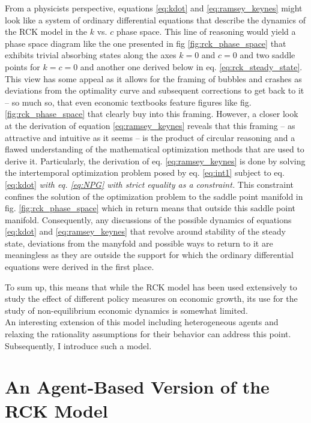 From a physicists perspective, equations \eqref{eq:kdot} and \eqref{eq:ramsey_keynes} might look like a system of ordinary differential equations that describe the dynamics of the RCK model in the $k$ vs. $c$ phase space. This line of reasoning would yield a phase space diagram like the one presented in fig \ref{fig:rck_phase_space} that exhibits trivial absorbing states along the axes $k=0$ and $c=0$ and two saddle points for $k=c=0$ and another one derived below in eq. \eqref{eq:rck_steady_state}.
This view has some appeal as it allows for the framing of bubbles and crashes as deviations from the optimality curve and subsequent corrections to get back to it -- so much so, that even economic textbooks feature figures like fig. \ref{fig:rck_phase_space} that clearly buy into this framing.
However, a closer look at the derivation of equation \eqref{eq:ramsey_keynes} reveals that this framing -- as attractive and intuitive as it seems -- is the product of circular reasoning and a flawed understanding of the mathematical optimization methods that are used to derive it. Particularly, the derivation of eq. \eqref{eq:ramsey_keynes} is done by solving the intertemporal optimization problem posed by eq. \eqref{eq:int1} subject to eq. \eqref{eq:kdot} \emph{with eq. \eqref{eq:NPG} with strict equality as a constraint.} This constraint confines the solution of the optimization problem to the saddle point manifold in fig. \ref{fig:rck_phase_space} which in return means that outside this saddle point manifold. Consequently, any discussions of the possible dynamics of equations \eqref{eq:kdot} and \eqref{eq:ramsey_keynes} that revolve around stability of the steady state, deviations from the manyfold and possible ways to return to it are meaningless as they are outside the support for which the ordinary differential equations were derived in the first place.

To sum up, this means that while the RCK model has been used extensively to study the effect of different policy measures on economic growth, its use for the study of non-equilibrium economic dynamics is somewhat limited. \\

An interesting extension of this model including heterogeneous agents and relaxing the rationality assumptions for their behavior can address this point. Subsequently, I introduce such a model.



\section{An Agent-Based Version of the RCK Model}
